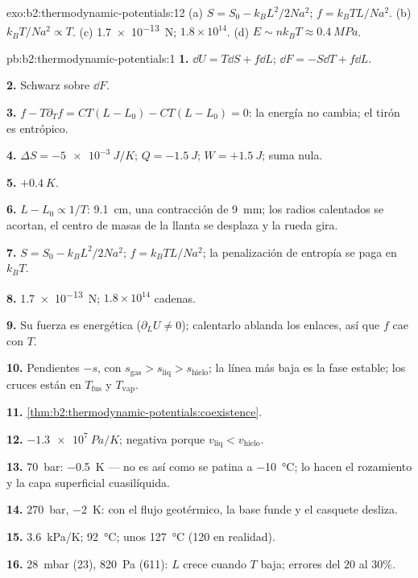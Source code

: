 \begin{solution}{exo:b2:thermodynamic-potentials:12}
(a) $S = S_0 - k_BL^2/2Na^2$; $f = k_BTL/Na^2$. (b) $k_BT/Na^2 \propto T$. (c)
\qty{1.7e-13}{N}; $1.8 \times 10^{14}$. (d) $E \sim nk_BT \approx \qty{0.4}{MPa}$.
\end{solution}

\begin{solution}{pb:b2:thermodynamic-potentials:1}
\textbf{1.} $\dd U = T\dd S + f\dd L$; $\dd F = -S\dd T + f\dd L$.

\textbf{2.} Schwarz sobre $\dd F$.

\textbf{3.} $f - T\partial_Tf = CT(L - L_0) - CT(L - L_0) = 0$: la energía
no cambia; el tirón es entrópico.

\textbf{4.} $\Delta S = \qty{-5e-3}{J/K}$; $Q = \qty{-1.5}{J}$; $W = +\qty{1.5}{J}$; suma
nula.

\textbf{5.} $+\qty{0.4}{K}$.

\textbf{6.} $L - L_0 \propto 1/T$: \qty{9.1}{cm}, una contracción de \qty{9}{mm}; los
radios calentados se acortan, el centro de masas de la llanta se desplaza y la rueda
gira.

\textbf{7.} $S = S_0 - k_BL^2/2Na^2$; $f = k_BTL/Na^2$; la penalización de entropía se
paga en $k_BT$.

\textbf{8.} \qty{1.7e-13}{N}; $1.8 \times 10^{14}$ cadenas.

\textbf{9.} Su fuerza es energética ($\partial_LU \ne 0$); calentarlo ablanda
los enlaces, así que $f$ cae con $T$.

\textbf{10.} Pendientes $-s$, con $s_{\text{gas}} > s_{\text{liq}} > s_{\text{hielo}}$; la
línea más baja es la fase estable; los cruces están en $T_{\text{fus}}$ y $T_{\text{vap}}$.

\textbf{11.} \cref{thm:b2:thermodynamic-potentials:coexistence}.

\textbf{12.} $\qty{-1.3e7}{Pa/K}$; negativa porque $v_{\text{liq}} < v_{\text{hielo}}$.

\textbf{13.} \qty{70}{bar}: \qty{-0.5}{K} --- no es así como se patina a
\qty{-10}{\celsius}; lo hacen el rozamiento y la capa superficial cuasilíquida.

\textbf{14.} \qty{270}{bar}, \qty{-2}{K}: con el flujo geotérmico, la
base funde y el casquete desliza.

\textbf{15.} \qty{3.6}{kPa/K}; \qty{92}{\celsius}; unos \qty{127}{\celsius}
(\qty{120}{} en realidad).

\textbf{16.} \qty{28}{mbar} (\qty{23}{}), \qty{820}{Pa} (\qty{611}{}): $L$ crece cuando $T$
baja; errores del $20$ al $30\%$.


\end{solution}
